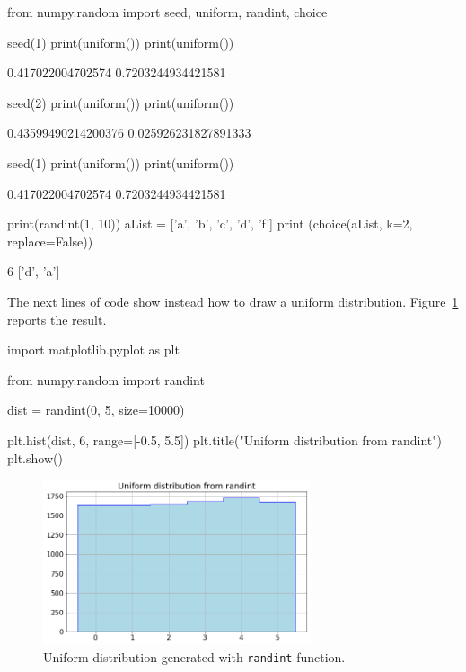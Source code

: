 \begin{ipython}
from numpy.random import seed, uniform, randint, choice

seed(1)
print(uniform())
print(uniform())
\end{ipython}
\begin{ioutput}
0.417022004702574
0.7203244934421581
\end{ioutput}
\begin{ipython}
seed(2)
print(uniform())
print(uniform())
\end{ipython}
\begin{ioutput}
0.43599490214200376
0.025926231827891333
\end{ioutput}
\begin{ipython}
seed(1)
print(uniform())
print(uniform())
\end{ipython}
\begin{ioutput}
0.417022004702574
0.7203244934421581
\end{ioutput}
\begin{ipython}
print(randint(1, 10))
aList = ['a', 'b', 'c', 'd', 'f']
print (choice(aList, k=2, replace=False))
\end{ipython}
\begin{ioutput}
6
['d', 'a']
\end{ioutput}

The next lines of code show instead how to draw a uniform distribution. Figure~\ref{fig:uniform_dist} reports the result.

\begin{ipython}
import matplotlib.pyplot as plt

from numpy.random import randint

dist = randint(0, 5, size=10000)

plt.hist(dist, 6, range=[-0.5, 5.5])
plt.title("Uniform distribution from randint")
plt.show()
\end{ipython}

\begin{figure}[h]
\centering
\includegraphics[width=0.7\textwidth]{figures/uniform}
\caption{Uniform distribution generated with \texttt{randint} function.}
\label{fig:uniform_dist}
\end{figure}
    
